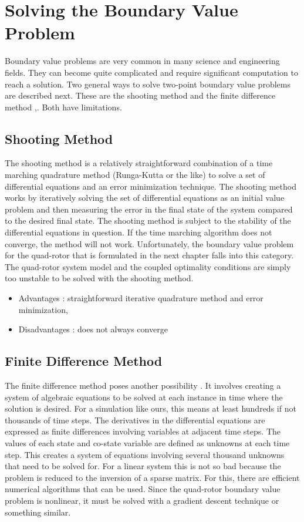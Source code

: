 \section{Solving the Boundary Value Problem}

Boundary value problems are very common in many science and engineering fields. They can become quite complicated and require significant computation to reach a solution. Two general ways to solve two-point boundary value problems are described next. These are the shooting method and the finite difference method \cite{keller1992numerical},\cite{rao2001applied}. Both have limitations.

\subsection{Shooting Method}

The shooting method is a relatively straightforward combination of a time marching quadrature method (Runga-Kutta or the like) to solve a set of differential equations and an error minimization technique. The shooting method works by iteratively solving the set of differential equations as an initial value problem and then measuring the error in the final state of the system compared to the desired final state. The shooting method is subject to the stability of the differential equations in question. If the time marching algorithm does not converge, the method will not work. Unfortunately, the boundary value problem for the quad-rotor that is formulated in the next chapter falls into this category. The quad-rotor system model and the coupled optimality conditions are simply too unstable to be solved with the shooting method.

\begin{itemize}
\item Advantages : straightforward iterative quadrature method and error minimization,
\item Disadvantages : does not always converge
\end{itemize}




\subsection{Finite Difference Method}

The finite difference method poses another possibility \cite{rao2001applied}. It involves creating a system of algebraic equations to be solved at each instance in time where the solution is desired. For a simulation like ours, this means at least hundreds if not thousands of time steps. The derivatives in the differential equations are expressed as finite differences involving variables at adjacent time steps. The values of each state and co-state variable are defined as unknowns at each time step. This creates a system of equations involving several thousand unknowns that need to be solved for. For a linear system this is not so bad because the problem is reduced to the inversion of a sparse matrix. For this, there are efficient numerical algorithms that can be used. Since the quad-rotor boundary value problem is nonlinear, it must be solved with a gradient descent technique or something similar.

